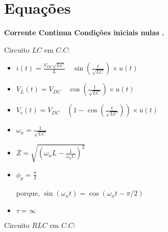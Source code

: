 \part*{Equa\c{c}\~{o}es} \label{eq}
%
\begin{flushleft}
{\bf Corrente Continua Condi\c{c}\~{o}es  iniciais  nulas .}\par
\end{flushleft}
 \quad Circuito  $LC$ em $C.C$:\par
%
\begin{itemize}
\item
$i(t)=\frac{V_{DC}\sqrt{LC}}{L}\quad \sin \left( \frac{t}{\sqrt{LC}}\right)\times u(t)$\par
\item
$V_L(t)=V_{DC}\quad \cos\left(\frac{t}{\sqrt{LC}} \right)\times u(t)$\par
\item
$V_c(t)=V_{DC}\quad \left(1-\cos\left(\frac{t}{\sqrt{LC}} \right) \right)\times u(t)$\par
\item
$\omega_n=\frac{1}{\sqrt{LC}}$\par
\item
$\overline{Z}=\sqrt{(\omega_n L-\frac{1}{\omega_n C})^2}$\par
\item
$\phi_p=\frac{\pi}{2}$\par
porque, $\sin(\omega_n t)= \cos(\omega_n t - \pi/2)$\par
\item
$\tau=\infty$\par
\end{itemize}
%
\quad Circuito  $RLC$ em $C.C$:\par
%

